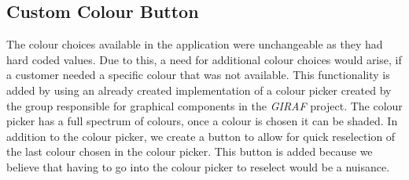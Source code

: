 \subsection{Custom Colour Button}
The colour choices available in the application were unchangeable as they had hard coded values.
Due to this, a need for additional colour choices would arise, if a customer needed a specific colour that was not available.
This functionality is added by using an already created implementation of a colour picker created by the group responsible for graphical components in the \textit{GIRAF} project. 
The colour picker has a full spectrum of colours, once a colour is chosen it can be shaded.
In addition to the colour picker, we create a button to allow for quick reselection of the last colour chosen in the colour picker.
This button is added because we believe that having to go into the colour picker to reselect would be a nuisance.